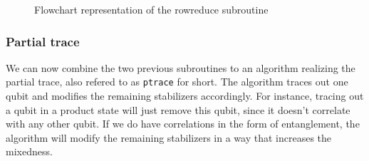 
\begin{figure}[H]
  \centering
  
  \caption{Flowchart representation of the rowreduce subroutine}
  \label{fig:rowreduce-diag}
\end{figure}

\subsubsection{Partial trace}\label{sec:ptrace}
We can now combine the two previous subroutines to an algorithm realizing the
partial trace, also refered to as \verb|ptrace| for short. The algorithm traces
out one qubit and modifies the remaining stabilizers accordingly. For instance,
tracing out a qubit in a product state will just remove this qubit, since it
doesn't correlate with any other qubit. If we do have correlations in the form
of entanglement, the algorithm will modify the remaining stabilizers in a way
that increases the mixedness. 

